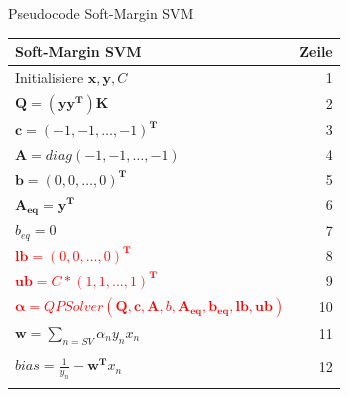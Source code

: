 \documentclass[ngerman]{beamer}
\begin{document}
\begin{frame}{Pseudocode Soft-Margin SVM}
    \begin{tabular}{|l r|}
        \hline
        \textbf{Soft-Margin SVM} & \textbf{Zeile} \\
        \hline
        Initialisiere $\mathbf{x}, \mathbf{y}, C$ & 1\\
        $\mathbf{Q} = (\mathbf{y}\mathbf{y}^{\mathbf{T}})\mathbf{K}$ & 2\\
        $\mathbf{c} = \left( -1, -1, \ldots, -1 \right)^{\mathbf{T}}$ & 3 \\
        $\mathbf{A} = diag\left( -1, -1, \ldots, -1 \right)$ & 4 \\
        $\mathbf{b} = \left( 0, 0, \ldots, 0 \right)^{\mathbf{T}}$ & 5\\
        $\mathbf{A_{eq}} = \mathbf{y}^{\mathbf{T}}$ & 6\\
        $b_{eq} = 0$ & 7\\
        \textcolor{red}{$\mathbf{lb} = \left( 0, 0, \ldots, 0 \right)^{\mathbf{T}}$} & 8 \\
        \textcolor{red}{$\mathbf{ub} = C * \left( 1, 1, \ldots, 1 \right)^{\mathbf{T}}$} & 9 \\
        \textcolor{red}{$\mathbf{\alpha} = QPSolver\left( \mathbf{Q}, \mathbf{c}, \mathbf{A}, b, \mathbf{A_{eq}}, \mathbf{b_{eq}}, \mathbf{lb}, \mathbf{ub} \right)$} & 10\\
        $\mathbf{w} = \sum\limits_{n=SV} \alpha_{n} y_{n} x_{n}$  & 11\\
        & \\[-1em]
        $bias = \frac{1}{y_{n}} - \mathbf{w}^{\mathbf{T}}x_{n}$ & 12\\
        & \\
        \hline
    \end{tabular}
\end{frame}
\end{document}
